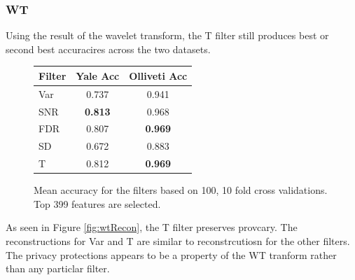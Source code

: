 \documentclass{article}
\begin{document}
\subsubsection{WT}

Using the result of the wavelet transform, the T filter still produces 
best or second best accuracires across the two datasets. 

\begin{figure}[!h]

\begin{minipage}[b]{1.0\linewidth}
  \centering
    \begin{tabular}{ | l || c | c |}
    \hline
    Filter & Yale Acc & Olliveti Acc \\ \hline
    Var & 0.737 & 0.941 \\ \hline 
    SNR & \textbf{0.813} & 0.968 \\ \hline
    FDR & 0.807 & \textbf{0.969} \\ \hline
    SD & 0.672 & 0.883 \\ \hline
    T & 0.812 & \textbf{0.969} \\
    \hline
    \end{tabular}
\end{minipage}
%
\caption{Mean accuracy for the filters based on 100, 10 fold cross validations. Top 399 features are
selected.}
\label{fig:res}
%
\end{figure}

As seen in Figure \ref{fig:wtRecon}, the T filter preserves provcary. The reconstructions
for Var and T are similar to reconstrcutiosn for the other filters. The privacy protections 
appears to be a property of the WT tranform rather than any particlar filter. 
\end{document}
